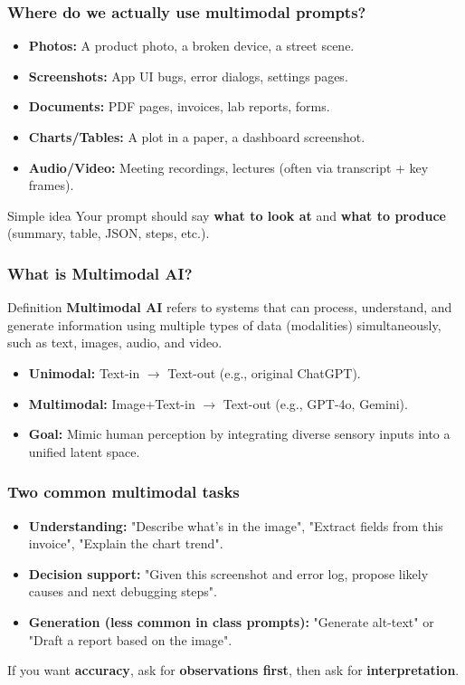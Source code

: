 \documentclass{beamer}
\begin{document}
\begin{frame}
    \frametitle{Where do we actually use multimodal prompts?}
    \begin{itemize}
        \item \textbf{Photos:} A product photo, a broken device, a street scene.
        \item \textbf{Screenshots:} App UI bugs, error dialogs, settings pages.
        \item \textbf{Documents:} PDF pages, invoices, lab reports, forms.
        \item \textbf{Charts/Tables:} A plot in a paper, a dashboard screenshot.
        \item \textbf{Audio/Video:} Meeting recordings, lectures (often via transcript + key frames).
    \end{itemize}
    \begin{block}{Simple idea}
        Your prompt should say \textbf{what to look at} and \textbf{what to produce} (summary, table, JSON, steps, etc.).
    \end{block}
\end{frame}

\begin{frame}
    \frametitle{What is Multimodal AI?}
    \begin{block}{Definition}
        \textbf{Multimodal AI} refers to systems that can process, understand, and generate information using multiple types of data (modalities) simultaneously, such as text, images, audio, and video.
    \end{block}
    \begin{itemize}
        \item \textbf{Unimodal:} Text-in $\to$ Text-out (e.g., original ChatGPT).
        \item \textbf{Multimodal:} Image+Text-in $\to$ Text-out (e.g., GPT-4o, Gemini).
        \item \textbf{Goal:} Mimic human perception by integrating diverse sensory inputs into a unified latent space.
    \end{itemize}
\end{frame}

\begin{frame}
    \frametitle{Two common multimodal tasks}
    \begin{itemize}
        \item \textbf{Understanding:} "Describe what's in the image", "Extract fields from this invoice", "Explain the chart trend".
        \item \textbf{Decision support:} "Given this screenshot and error log, propose likely causes and next debugging steps".
        \item \textbf{Generation (less common in class prompts):} "Generate alt-text" or "Draft a report based on the image".
    \end{itemize}
    \begin{block}{}
        If you want \textbf{accuracy}, ask for \textbf{observations first}, then ask for \textbf{interpretation}.
    \end{block}
\end{frame}
\end{document}
